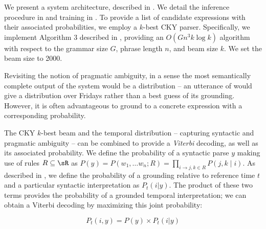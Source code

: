 We present a system architecture, described in .
We detail the inference procedure in 
	and training in .
To provide a list of
	candidate expressions with their associated probabilities, we
	employ a $k$-best CKY parser.
Specifically, we implement Algorithm 3 described in 
	, providing an $O(Gn^3k\log k)$ algorithm
	with respect to the grammar size $G$, phrase length $n$, and beam size $k$.
We set the beam size to 2000.

Revisiting the notion of pragmatic ambiguity,
	in a sense the most semantically complete output of the system would be
	a distribution -- 
	an utterance of  would give a distribution over Fridays
	rather than a best guess of its grounding.
However, it is often advantageous to ground to a concrete expression with a
	corresponding probability.

The CKY $k$-best beam and the temporal distribution 
	-- capturing syntactic and pragmatic ambiguity --
	can be combined to provide a \textit{Viterbi} decoding, as well as
	its associated probability.
We define the probability of a syntactic parse $y$ making use of rules 
	$R \subseteq \sR$ as
	$P(y) = P(w_1,\dots w_n; R) = \prod_{i \rightarrow j,k \in R}P(j,k \mid i)$.
	As described in , we define the probability of a 
	grounding relative to reference time $t$ and a particular
	syntactic interpretation as $P_t(i | y)$.
The product of these two terms provides the probability of a grounded temporal
	interpretation; we can obtain a Viterbi decoding by maximizing this
	joint probability:

\begin{equation}
	P_t(i, y) = 
		P( y ) \times P_t(i | y)
\label{eqn:prob}
\end{equation}


